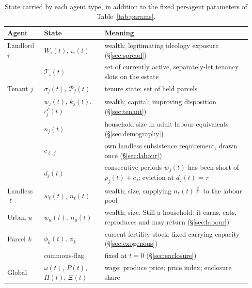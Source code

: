 \documentclass[11pt,english]{article}
\begin{document}
\begin{table}[H]
\centering
\scriptsize
\begin{tabular}{@{}llp{6.6cm}@{}}
\toprule
Agent & State & Meaning \\
\midrule
Landlord $i$ & $W_i(t)$, $\iota_i(t)$ & wealth; legitimating ideology exposure (\S\ref{sec:spread}) \\
 & $\mathcal{T}_i(t)$ & set of currently active, separately-let tenancy slots on the estate \\
Tenant $j$ & $\sigma_j(t)$, $\mathcal{P}_j(t)$ & tenure state; set of held parcels \\
 & $w_j(t)$, $k_j(t)$, $\iota_j^{T}(t)$ & wealth; capital; improving disposition (\S\ref{sec:tenant}) \\
 & $n_j(t)$ & household size in adult labour equivalents (\S\ref{sec:demography}) \\
 & $c_{\ell,j}$ & own landless subsistence requirement, drawn once (\S\ref{sec:labour}) \\
 & $d_j(t)$ & consecutive periods $w_j(t)$ has been short of $\rho_j(t)+c_j$; eviction at $d_j(t)=\tau$ \\
Landless $\ell$ & $w_\ell(t)$, $n_\ell(t)$ & wealth; size, supplying $n_\ell(t)\bar\ell$ to the labour pool \\
Urban $u$ & $w_u(t)$, $n_u(t)$ & wealth; size. Still a household: it earns, eats, reproduces and may return (\S\ref{sec:labour}) \\
Parcel $k$ & $\phi_k(t)$, $\bar\phi_k$ & current fertility stock; fixed carrying capacity (\S\ref{sec:exogenous}) \\
 & commons-flag & fixed at $t=0$ (\S\ref{sec:enclosure}) \\
Global & $\omega(t)$, $P(t)$, $\Pi(t)$, $\Xi(t)$ & wage; produce price; price index; enclosure share \\
\bottomrule
\end{tabular}
\caption{State carried by each agent type, in addition to the fixed per-agent parameters of Table~\ref{tab:params}.}
\label{tab:state}
\end{table}
\end{document}
